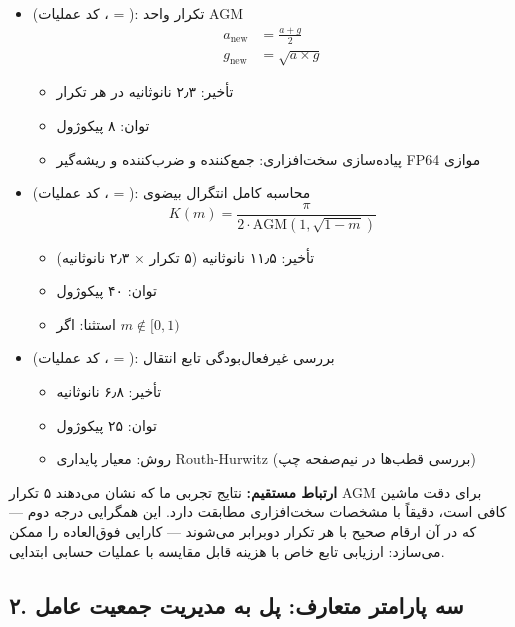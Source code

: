 \documentclass[12pt, a4paper]{article}
\begin{document}
\begin{itemize}
\item \textbf{} (کد عملیات ،  = ): تکرار واحد AGM
\begin{equation}
\begin{aligned}
a_{\text{new}} &= \frac{a + g}{2} \\
g_{\text{new}} &= \sqrt{a \times g}
\end{aligned}
\end{equation}
\begin{itemize}
\item تأخیر: ۲٫۳ نانوثانیه در هر تکرار
\item توان: ۸ پیکوژول
\item پیاده‌سازی سخت‌افزاری: جمع‌کننده و ضرب‌کننده و ریشه‌گیر FP64 موازی
\end{itemize}

\item \textbf{} (کد عملیات ،  = ): محاسبه کامل انتگرال بیضوی
\begin{equation}
K(m) = \frac{\pi}{2 \cdot \text{AGM}(1, \sqrt{1-m})}
\end{equation}
\begin{itemize}
\item تأخیر: ۱۱٫۵ نانوثانیه (۵ تکرار × ۲٫۳ نانوثانیه)
\item توان: ۴۰ پیکوژول
\item استثنا:  اگر $m \notin [0,1)$
\end{itemize}

\item \textbf{} (کد عملیات ،  = ): بررسی غیرفعال‌بودگی تابع انتقال
\begin{itemize}
\item تأخیر: ۶٫۸ نانوثانیه
\item توان: ۲۵ پیکوژول
\item روش: معیار پایداری Routh-Hurwitz (بررسی قطب‌ها در نیم‌صفحه چپ)
\end{itemize}
\end{itemize}

\textbf{ارتباط مستقیم:} نتایج تجربی ما که نشان می‌دهند ۵ تکرار AGM برای دقت ماشین کافی است، دقیقاً با مشخصات سخت‌افزاری  مطابقت دارد. این همگرایی درجه دوم — که در آن ارقام صحیح با هر تکرار دوبرابر می‌شوند — کارایی فوق‌العاده را ممکن می‌سازد: ارزیابی تابع خاص با هزینه قابل مقایسه با عملیات حسابی ابتدایی.

\subsection*{۲. سه پارامتر متعارف: پل به مدیریت جمعیت عامل}
\end{document}
